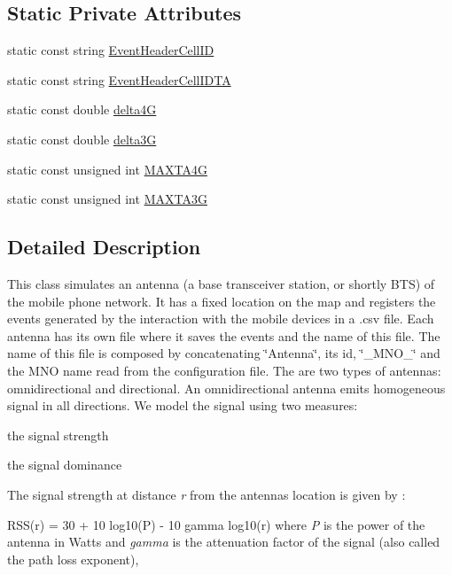 \subsection*{Static Private Attributes}
\begin{DoxyCompactItemize}
\item 
static const string \hyperlink{class_antenna_aff940632ce74397357cb5400c0c47599}{Event\+Header\+Cell\+ID}
\item 
static const string \hyperlink{class_antenna_a1a3e590ebd908d331e725c865cc629dd}{Event\+Header\+Cell\+I\+D\+TA}
\item 
static const double \hyperlink{class_antenna_a929c2809d9dff6252471abfd4872ef5b}{delta4G}
\item 
static const double \hyperlink{class_antenna_a77a68a26f1e7844c358960da0e432c79}{delta3G}
\item 
static const unsigned int \hyperlink{class_antenna_a8986d0863767e330a12751aad05d9c25}{M\+A\+X\+T\+A4G}
\item 
static const unsigned int \hyperlink{class_antenna_a29191686e9d14f85bd84c8e43c2237fb}{M\+A\+X\+T\+A3G}
\end{DoxyCompactItemize}


\subsection{Detailed Description}
This class simulates an antenna (a base transceiver station, or shortly B\+TS) of the mobile phone network. It has a fixed location on the map and registers the events generated by the interaction with the mobile devices in a .csv file. Each antenna has its own file where it saves the events and the name of this file. The name of this file is composed by concatenating \char`\"{}\+Antenna\char`\"{}, its id, \char`\"{}\+\_\+\+M\+N\+O\+\_\+\char`\"{} and the M\+NO name read from the configuration file. The are two types of antennas\+: omnidirectional and directional. An omnidirectional antenna emits homogeneous signal in all directions. We model the signal using two measures\+: \begin{DoxyItemize}
\item the signal strength \item the signal dominance\end{DoxyItemize}
The signal strength at distance {\itshape r} from the antenna\textquotesingle{}s location is given by \+:

R\+S\+S(r) = 30 + 10 log10(\+P) -\/ 10 gamma log10(r) where {\itshape P} is the power of the antenna in Watts and {\itshape gamma} is the attenuation factor of the signal (also called the path loss exponent),

